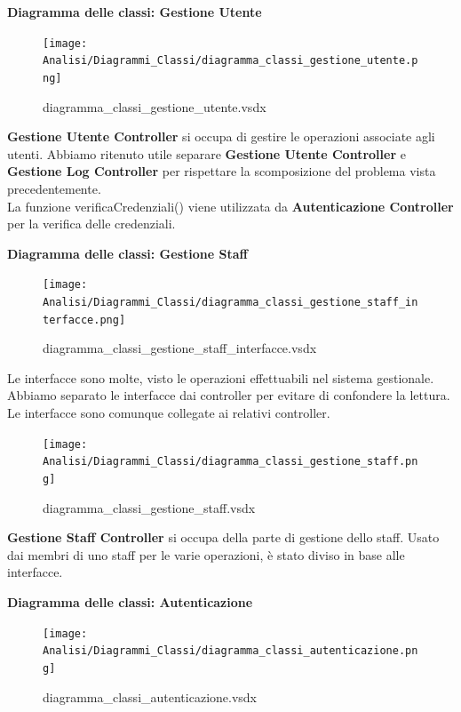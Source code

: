 \documentclass[a4paper]{article}
\begin{document}
\textbf{Diagramma delle classi: Gestione Utente}


\begin{figure}[H]
    \texttt{[image: Analisi/Diagrammi\_Classi/diagramma\_classi\_gestione\_utente.png]}
    \centering
    \caption{diagramma\_classi\_gestione\_utente.vsdx}
\end{figure}

\textbf{Gestione Utente Controller} si occupa di gestire le operazioni associate agli utenti. Abbiamo ritenuto utile separare \textbf{Gestione Utente Controller} e \textbf{Gestione Log Controller} per rispettare la scomposizione del problema vista precedentemente.\\La funzione verificaCredenziali() viene utilizzata da \textbf{Autenticazione Controller} per la verifica delle credenziali.

\newpage

\textbf{Diagramma delle classi: Gestione Staff}

\begin{figure}[H]
    \texttt{[image: Analisi/Diagrammi\_Classi/diagramma\_classi\_gestione\_staff\_interfacce.png]}
    \centering
    \caption{diagramma\_classi\_gestione\_staff\_interfacce.vsdx}
\end{figure}

Le interfacce sono molte, visto le operazioni effettuabili nel sistema gestionale. Abbiamo separato le interfacce dai controller per evitare di confondere la lettura. Le interfacce sono comunque collegate ai relativi controller.

\begin{figure}[H]
    \texttt{[image: Analisi/Diagrammi\_Classi/diagramma\_classi\_gestione\_staff.png]}
    \centering
    \caption{diagramma\_classi\_gestione\_staff.vsdx}
\end{figure}

\textbf{Gestione Staff Controller} si occupa della parte di gestione dello staff. Usato dai membri di uno staff per le varie operazioni, è stato diviso in base alle interfacce. 


\newpage

\textbf{Diagramma delle classi: Autenticazione}

\begin{figure}[H]
    \texttt{[image: Analisi/Diagrammi\_Classi/diagramma\_classi\_autenticazione.png]}
    \centering
    \caption{diagramma\_classi\_autenticazione.vsdx}
\end{figure}
\end{document}
